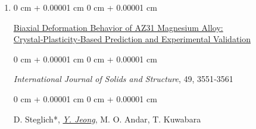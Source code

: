 \documentclass[10pt, letterpaper]{article}
\newenvironment{onecolentry}{
    \begin{adjustwidth}{
        0 cm + 0.00001 cm
    }{
        0 cm + 0.00001 cm
    }
}{
    \end{adjustwidth}
} %
\newenvironment{twocolentry}[2][]{
    \onecolentry
    \def\secondColumn{#2}
    \setcolumnwidth{\fill, 4.5 cm}
    \begin{paracol}{2}
}{
    \switchcolumn \raggedleft \secondColumn
    \end{paracol}
    \endonecolentry
} %
\begin{document}
\begin{enumerate}
        \item
        \begin{twocolentry}{2012}
            \href{http://dx.doi.org/10.1016/j.ijsolstr.2012.06.017}{Biaxial Deformation Behavior of AZ31 Magnesium Alloy: Crystal‑Plasticity‑Based Prediction and Experimental Validation}
        \end{twocolentry}
        \begin{onecolentry}
            {\it International Journal of Solids and Structure}, 49, 3551‑3561
        \end{onecolentry}
        \begin{onecolentry}
            D. Steglich*, {\underline{\textit{Y. Jeong}}}, M. O. Andar, T. Kuwabara
        \end{onecolentry}
        \vspace{0.10 cm}

    \end{enumerate}
\end{document}
